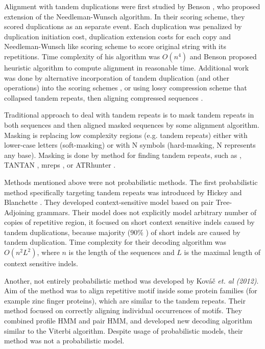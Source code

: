 Alignment with tandem duplications were first studied by Benson
\cite{Benson1997}, who proposed extension of the Needleman-Wunsch algorithm. In
their scoring scheme, they scored duplications as an separate event. Each
duplication was penalized by duplication initiation cost, duplication extension
costs for each copy and Needleman-Wunsch like scoring scheme to score original
string with its repetitions. Time complexity of his algorithm was $O(n^4)$ and
Benson proposed heuristic algorithm to compute alignment in reasonable time.
Additional work was done by alternative incorporation of tandem duplication
(and other operations) into the scoring schemes \cite{Sammeth2006, Berard2006,
Freschi2012}, or using lossy compression scheme that collapsed tandem repeats,
then aligning compressed sequences \cite{Freschi2012}.

Traditional approach to deal with tandem repeats is to mask tandem repeats in
both sequences and then aligned masked sequences by some alignment algorithm.
Masking is replacing low complexity regions (e.g. tandem repeats) either with
lower-case letters (soft-masking) or with N symbols (hard-masking, N represents
any base). Masking is done by method for finding tandem repeats, such as
 \cite{Benson1999}, TANTAN
\cite{Frith2011}, mreps \cite{Kolpakov2003}, or ATRhunter \cite{Wexler2005}. 

Methods mentioned above were not probabilistic methods. The first probabilistic
method specifically targeting tandem repeats was introduced by Hickey and
Blanchette \cite{Hickey2011}.  They developed context-sensitive model based on
pair Tree-Adjoining grammars.  Their model does not explicitly model arbitrary
number of copies of repetitive region, it focused on short context sensitive
indels caused by tandem duplications, because majority ($90\%$
\cite{Hickey2011}) of short indels are caused by tandem duplication. Time
complexity for their decoding algorithm was $O(n^2L^2)$, where $n$ is the
length of the sequences and $L$ is the maximal length of context sensitive
indels.

Another, not entirely probabilistic method was developed by Kováč {\it et. al
(2012)}\nocite{Kovac2012}. Aim of the method was to align repetitive motif
inside some protein families (for example zinc finger proteins), which are
similar to the tandem repeats. Their method focused on correctly aligning
individual occurrences of motifs. They combined profile HMM and pair HMM, and
developed new decoding algorithm similar to the Viterbi algorithm. Despite
usage of probabilistic models, their method was not a probabilistic model. 

